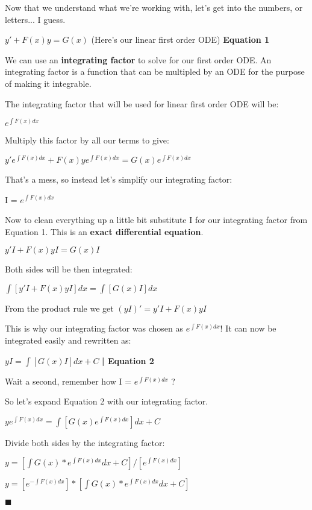\documentclass[12pt]{article}
\begin{document}
Now that we understand what we're working with, let's get into the numbers, or letters... I guess.

\bigskip

$y' + F(x)y = G(x)$ (Here's our linear first order ODE) {\bf Equation 1}

\bigskip

We can use an {\bf integrating factor} to solve for our first order ODE. An integrating factor is a function that can be multipled by an ODE for the purpose of making it integrable.


The integrating factor that will be used for linear first order ODE will be:

\bigskip

$e^{\int F(x) dx}$


\bigskip

Multiply this factor by all our terms to give:

\bigskip

$y'e^{\int F(x) dx} + F(x)ye^{\int F(x) dx}  = G(x)e^{\int F(x) dx} $

\bigskip
\bigskip

That's a mess, so instead let's simplify our integrating factor:

\bigskip

I = $e^{\int F(x) dx}$


\bigskip
\bigskip

Now to clean everything up a little bit substitute I for our integrating factor from Equation 1. This is an {\bf exact differential equation}.

\bigskip
$y'I + F(x)yI  = G(x)I $

\bigskip
\bigskip

Both sides will be then integrated:

${\int [y'I + F(x)yI] dx} = {\int [G(x)I] dx}$

\bigskip

From the product rule we get $(yI)' = y'I + F(x)yI$ 

This is why our integrating factor was chosen as $e^{\int F(x) dx}$! It can now be integrated easily and rewritten as:

{\bf $yI = {\int [G(x)I]dx + C}$ } {\bf | Equation 2}


\bigskip

Wait a second, remember how I = $e^{\int F(x) dx}$ ?

\bigskip

So let's expand Equation 2 with our integrating factor.

\bigskip

$ye^{\int F(x) dx} = {\int [G(x)e^{\int F(x) dx}]dx + C}$ 

\bigskip

Divide both sides by the integrating factor:

$y = [ \int G(x) * e^{\int F(x) dx } dx + C] / [ e^{\int F(x) dx} ] $

\bigskip
\bigskip
\begin{center}
$y = [ e^{-\int F(x) dx} ] * [ \int G(x) * e^{\int F(x) dx } dx + C]$

\end{center}

\raggedleft $\blacksquare$
\end{document}
